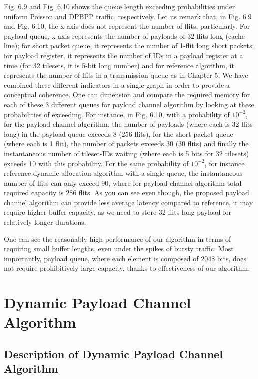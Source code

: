 Fig. 6.9 and Fig. 6.10 shows the queue length exceeding probabilities under uniform Poisson and DPBPP traffic, respectively. Let us remark that, in Fig. 6.9 and Fig. 6.10, the x-axis does not represent the number of flits, particularly. For payload queue, x-axis represents the number of payloads of 32 flits long (cache line); for short packet queue, it represents the number of 1-flit long short packets; for payload register, it represents the number of IDs in a payload register at a time (for 32 tilesets, it is 5-bit long number) and for reference algorithm, it represents the number of flits in a transmission queue as in Chapter 5. We have combined these different indicators in a single graph in order to provide a conceptual coherence. One can dimension and compare the required memory for each of these 3 different queues for payload channel algorithm by looking at these probabilities of exceeding. For instance, in Fig. 6.10, with a probability of $10^{-2}$, for the payload channel algorithm, the number of payloads (where each is 32 flits long) in the payload queue exceeds 8 (256 flits), for the short packet queue (where each is 1 flit), the number of packets exceeds 30 (30 flits) and finally the instantaneous number of tileset-IDs waiting (where each is 5 bits for 32 tilesets) exceeds 10 with this probability. For the same probability of $10^{-2}$, for instance reference dynamic allocation algorithm with a single queue, the instantaneous number of flits can only exceed 90, where for payload channel algorithm total required capacity is 286 flits. As you can see even though, the proposed payload channel algorithm can provide less average latency compared to reference, it may require higher buffer capacity, as we need to store 32 flits long payload for relatively longer durations.   
     
One can see the reasonably high performance of our algorithm in terms of requiring small buffer lengths, even under the spikes of bursty traffic. Most importantly, payload queue, where each element is composed of 2048 bits, does not require prohibitively large capacity, thanks to effectiveness of our algorithm. 


\section{Dynamic Payload Channel Algorithm}

\subsection{Description of Dynamic Payload Channel Algorithm}

